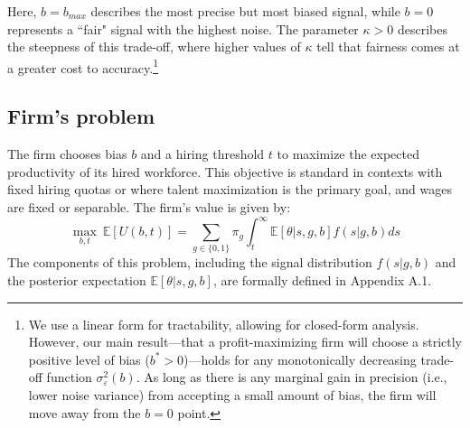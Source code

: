 Here, $b=b_{max}$ describes the most precise but most biased signal, while $b=0$ represents a ``fair" signal with the highest noise. The parameter $\kappa > 0$ describes the steepness of this trade-off, where higher values of $\kappa$ tell that fairness comes at a greater cost to accuracy.\footnote{We use a linear form for tractability, allowing for closed-form analysis. However, our main result—that a profit-maximizing firm will choose a strictly positive level of bias ($b^*>0$)—holds for any monotonically decreasing trade-off function $\sigma_\varepsilon^2(b)$. As long as there is any marginal gain in precision (i.e., lower noise variance) from accepting a small amount of bias, the firm will move away from the $b=0$ point.}

\subsection{Firm's problem}
The firm chooses bias $b$ and a hiring threshold $t$ to maximize the expected productivity of its hired workforce. This objective is standard in contexts with fixed hiring quotas or where talent maximization is the primary goal, and wages are fixed or separable. The firm's value is given by:
\begin{equation}
\max_{b, t} \ \mathbb{E}[U(b,t)] = \sum_{g \in \{0,1\}} \pi_g \int_t^\infty \mathbb{E}[\theta | s, g, b] f(s|g, b) ds
\end{equation}
The components of this problem, including the signal distribution $f(s|g,b)$ and the posterior expectation $\mathbb{E}[\theta|s,g,b]$, are formally defined in Appendix A.1.